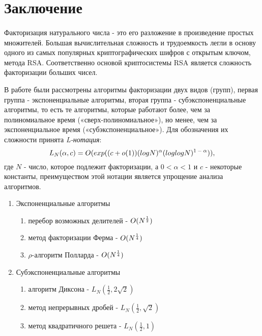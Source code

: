   
\section{Заключение}

\paragraph{} Факторизация натурального числа - это его разложение в произведение простых множителей. Большая вычислительная сложность и трудоемкость легли в основу одного из самых популярных криптографических шифров с открытым ключом, метода RSA. Соответственно основой криптосистемы RSA является сложность факторизации больших чисел.
  
  В работе были рассмотрены алгоритмы факторизации двух видов (групп), первая группа - экспоненциальные 
  алгоритмы, вторая группа - субэкспоненциальные алгоритмы, то есть те алгоритмы, которые работают более, чем за полиномиальное время («сверх-полиномиальное»),
  но менее, чем за экспоненциальное время («субэкспоненциальное»). Для обозначения их сложности принята \textit{L-нотация}:  
    \begin{equation} \label{eq:prime-fact-lnc}
     L_N(\alpha,c)=O(exp((c+o(1))(logN)^\alpha(loglogN)\textsuperscript{{$1-\alpha$}})), 
    \end{equation}    
  где {$N$} - число, которое подлежит факторизации, а {$0 < \alpha < 1$} и {$c$} - некоторые константы, преимуществом этой нотации является упрощение 
  анализа алгоритмов.
  
    \begin{enumerate}
     \item Экспоненциальные алгоритмы
     
    	\begin{enumerate}
    	 \item перебор возможных делителей - {$O(N\textsuperscript{{$\frac{1}{2}$}})$}
    	 \item метод факторизации Ферма - {$O(N\textsuperscript{{$\frac{1}{4}$}})$}
    	 \item {$\rho$}-алгоритм Полларда - {$O(N\textsuperscript{{$\frac{1}{4}$}})$}
    	\end{enumerate}
     
     \item Субэкспоненциальные алгоритмы
     
    	\begin{enumerate}
    	 \item алгоритм Диксона - {$L_N(\frac{1}{2}, 2\sqrt{2})$}
    	 \item метод непрерывных дробей - {$L_N(\frac{1}{2}, \sqrt{2})$}
    	 \item метод квадратичного решета - {$L_N(\frac{1}{2}, 1)$}	
    	\end{enumerate}

    \end{enumerate}
    
